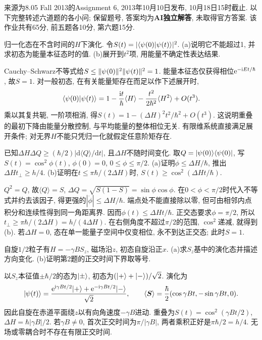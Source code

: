来源为8.05 Fall 2013的Assignment 6, 2013年10月10日发布, 10月18日15时截止. 以下完整转述六道题的各小问; 保留题号, 答案均为\textbf{AI独立解答}, 未取得官方答案. 该作业共有65分, 前五题各10分, 第六题15分.

\begin{exercise}
归一化态在不含时间的$H$下演化. 令$S(t)=|\langle \psi(0)\vert \psi(t)\rangle|^2$. (a)说明它不能超过1, 并求初态为能量本征态时的值. (b)展开到$t^2$项, 用能量不确定性表达结果.
\end{exercise}
\begin{solution}
Cauchy--Schwarz不等式给$S\leq\lVert \psi(0)\rVert^2\lVert \psi(t)\rVert^2=1$. 能量本征态仅获得相位$\mathrm e^{-\mathrm i Et/\hbar}$, 故$S=1$. 对一般初态, 在有关能量矩存在而足以作下述展开时,
\[
\langle \psi(0)\vert \psi(t)\rangle=1-\frac{\mathrm i t}{\hbar}\langle H\rangle-\frac{t^2}{2\hbar^2}\langle H^2\rangle+O(t^3).
\]
乘以其复共轭, 一阶项相消, 得$S(t)=1-(\Delta H)^2t^2/\hbar^2+O(t^3)$. 这说明重叠的最初下降由能量分散控制, 与平均能量的整体相位无关. 有限维系统直接满足展开条件; 对无界$H$不能只凭归一化就假定任意阶矩存在.
\end{solution}

\begin{exercise}
已知$\Delta H\Delta Q\geq(\hbar/2)|\mathrm d\langle Q\rangle/\mathrm dt|$, 且$\Delta H$不随时间变化. 取$Q=\lvert \psi(0)\rangle\langle \psi(0)\rvert$, 写$S(t)=\cos^2\phi(t)$, $\phi(0)=0$, $0\leq\phi\leq\pi/2$. (a)证明$\dot\phi\leq\Delta H/\hbar$, 推出$\Delta Ht_\perp\geq h/4$. (b)证明在$t\leq\pi\hbar/(2\Delta H)$时, $S(t)\geq\cos^2(\Delta Ht/\hbar)$.
\end{exercise}
\begin{solution}
$Q^2=Q$, 故$\langle Q\rangle=S$, $\Delta Q=\sqrt{S(1-S)}=\sin\phi\cos\phi$. 在$0<\phi<\pi/2$时代入不等式并约去该因子, 得更强的$|\dot\phi|\leq\Delta H/\hbar$. 端点处不能直接除以零, 但可由相邻内点积分和连续性得到同一角距离界. 因而$\phi(t)\leq\Delta Ht/\hbar$. 正交态要求$\phi=\pi/2$, 所以$t_\perp\geq\pi\hbar/(2\Delta H)=h/(4\Delta H)$. 在右侧角度不超过$\pi/2$的范围, $\cos^2$递减, 就得到(b). 若$\Delta H=0$, 态在单一能量子空间中仅变相位, 永不到达正交态; 此时$S=1$.
\end{solution}

\begin{exercise}
自旋$1/2$粒子有$H=-\gamma B S_z$, 磁场沿$z$, 初态自旋沿正$x$. (a)求$S_z$基中的演化态并描述方向变化. (b)证明第2题的正交时间下界取等号.
\end{exercise}
\begin{solution}
以$S_z$本征值$\pm\hbar/2$的态为$\lvert \pm\rangle$, 初态为$(\lvert +\rangle+\lvert -\rangle)/\sqrt2$. 演化为
\[
\lvert \psi(t)\rangle=\frac{\mathrm e^{\mathrm i\gamma Bt/2}\lvert +\rangle+\mathrm e^{-\mathrm i\gamma Bt/2}\lvert -\rangle}{\sqrt2},\qquad
\langle\boldsymbol S\rangle=\frac\hbar2(\cos\gamma Bt,-\sin\gamma Bt,0).
\]
因此自旋在赤道平面绕$z$以有向角速度$-\gamma B$进动. 重叠为$S(t)=\cos^2(\gamma Bt/2)$, $\Delta H=\hbar|\gamma B|/2$. 若$\gamma B\neq0$, 首次正交时间为$\pi/|\gamma B|$, 两者乘积正好是$\pi\hbar/2=h/4$. 无场或零耦合时不存在有限正交时间.
\end{solution}

